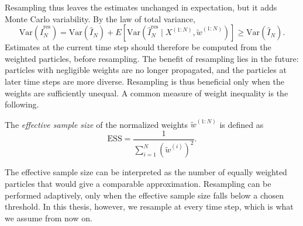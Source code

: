 Resampling thus leaves the estimates unchanged in expectation, but it adds Monte Carlo variability. By the law of total variance,
\begin{equation}
    \mathrm{Var}\left(\hat{I}_N^{\mathrm{res}}\right) = \mathrm{Var}\left(\hat{I}_N\right) + E\left[\mathrm{Var}\left(\hat{I}_N^{\mathrm{res}} \mid X^{(1:N)}, \tilde{w}^{(1:N)}\right)\right] \ge \mathrm{Var}\left(\hat{I}_N\right).
\end{equation}
Estimates at the current time step should therefore be computed from the weighted particles, before resampling. The benefit of resampling lies in the future: particles with negligible weights are no longer propagated, and the particles at later time steps are more diverse. Resampling is thus beneficial only when the weights are sufficiently unequal. A common measure of weight inequality is the following.

\begin{definition}
    \label{def:ess}
    The \emph{effective sample size} of the normalized weights $\tilde{w}^{(1:N)}$ is defined as
    \begin{equation}
        \mathrm{ESS} = \frac{1}{\sum_{i=1}^{N} \left(\tilde{w}^{(i)}\right)^2}.
        \label{eq:ess}
    \end{equation}
\end{definition}

The effective sample size can be interpreted as the number of equally weighted particles that would give a comparable approximation. Resampling can be performed adaptively, only when the effective sample size falls below a chosen threshold. In this thesis, however, we resample at every time step, which is what we assume from now on.

